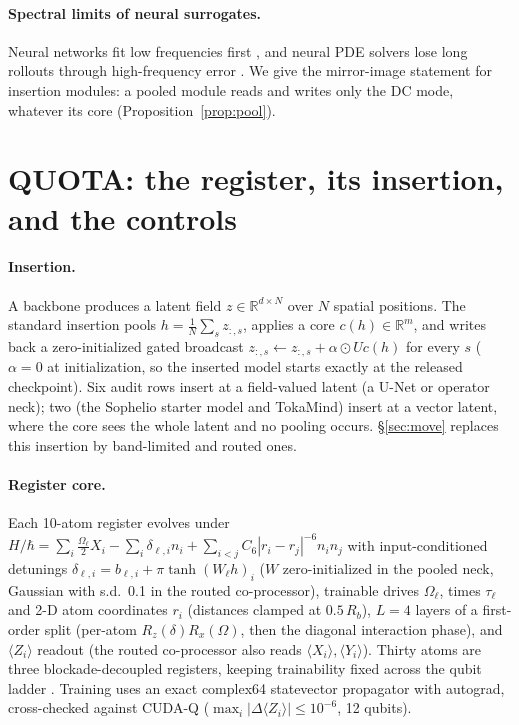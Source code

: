 \documentclass{article}
\begin{document}
\paragraph{Spectral limits of neural surrogates.} Neural networks fit low frequencies first
\citep{rahaman2019spectral}, and neural PDE solvers lose long rollouts through high-frequency error
\citep{lippe2023pderefiner}. We give the mirror-image statement for insertion modules: a pooled module reads and
writes only the DC mode, whatever its core (Proposition~\ref{prop:pool}).

\section{QUOTA: the register, its insertion, and the controls}
\label{sec:system}

\paragraph{Insertion.} A backbone produces a latent field $z \in \mathbb{R}^{d \times N}$ over $N$ spatial positions.
The standard insertion pools $h = \frac1N\sum_{s} z_{:,s}$, applies a core $c(h) \in \mathbb{R}^{m}$, and writes back a
zero-initialized gated broadcast $z_{:,s} \leftarrow z_{:,s} + \alpha \odot U c(h)$ for every $s$ ($\alpha = 0$ at
initialization, so the inserted model starts exactly at the released checkpoint). Six audit rows insert at a
field-valued latent (a U-Net or operator neck); two (the Sophelio starter model and TokaMind) insert at a vector
latent, where the core sees the whole latent and no pooling occurs. \S\ref{sec:move} replaces this insertion by
band-limited and routed ones.

\paragraph{Register core.} Each 10-atom register evolves under
$H/\hbar = \sum_i \tfrac{\Omega_\ell}{2} X_i - \sum_i \delta_{\ell,i} n_i + \sum_{i<j} C_6 |r_i - r_j|^{-6} n_i n_j$
with input-conditioned detunings $\delta_{\ell,i} = b_{\ell,i} + \pi\tanh(W_\ell h)_i$ ($W$ zero-initialized in the pooled
neck, Gaussian with s.d.\ 0.1 in the routed co-processor),
trainable drives $\Omega_\ell$, times $\tau_\ell$ and 2-D atom coordinates $r_i$ (distances clamped at $0.5\,R_b$),
$L{=}4$ layers of a first-order split (per-atom $R_z(\delta)R_x(\Omega)$, then the diagonal interaction phase), and
$\langle Z_i\rangle$ readout (the routed co-processor also reads $\langle X_i\rangle,\langle Y_i\rangle$). Thirty atoms are three blockade-decoupled registers, keeping trainability fixed across
the qubit ladder \citep{cerezo2025barren}. Training uses an exact complex64 statevector propagator with autograd,
cross-checked against CUDA-Q ($\max_i|\Delta\langle Z_i\rangle| \le 10^{-6}$, 12 qubits).
\end{document}
